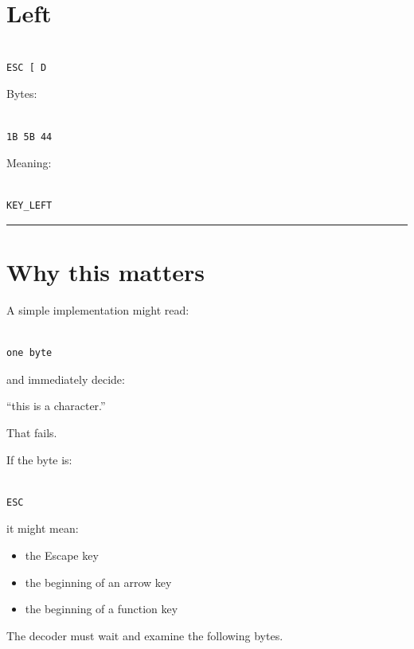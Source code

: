\documentclass[
  oneside,
  openany]{book}
\providecommand{\tightlist}{%
  \setlength{\itemsep}{0pt}\setlength{\parskip}{0pt}}
\begin{document}
\hypertarget{left}{%
\section{Left}\label{left}}

\begin{verbatim}

ESC [ D
\end{verbatim}

Bytes:

\begin{verbatim}

1B 5B 44
\end{verbatim}

Meaning:

\begin{verbatim}

KEY_LEFT
\end{verbatim}

\begin{center}\rule{0.5\linewidth}{0.5pt}\end{center}

\hypertarget{why-this-matters}{%
\section{Why this matters}\label{why-this-matters}}

A simple implementation might read:

\begin{verbatim}

one byte
\end{verbatim}

and immediately decide:

``this is a character.''

That fails.

If the byte is:

\begin{verbatim}

ESC
\end{verbatim}

it might mean:

\begin{itemize}
\tightlist
\item
  the Escape key
\item
  the beginning of an arrow key
\item
  the beginning of a function key
\end{itemize}

The decoder must wait and examine the following bytes.
\end{document}
